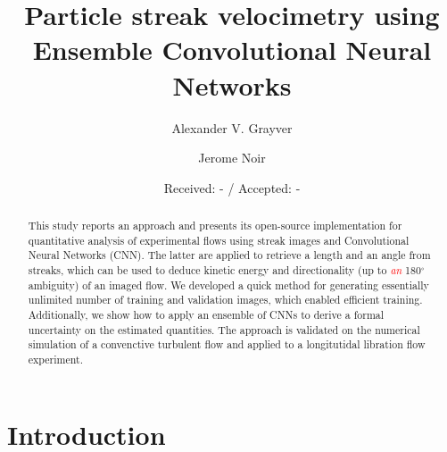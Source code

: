 \documentclass{svjour3}                     %
\newcommand{\new}[1]{\textit{\textcolor{red}{#1}}}
\begin{document}
\title{Particle streak velocimetry using Ensemble Convolutional Neural Networks}

\author{Alexander V. Grayver         \and
        Jerome Noir
}


\date{Received: - / Accepted: -}


\maketitle

\begin{abstract}
This study reports an approach and presents its open-source implementation for quantitative analysis of experimental flows using streak images and Convolutional Neural Networks (CNN). The latter are applied to retrieve a length and an angle from streaks, which can be used to deduce kinetic energy and directionality (up to \new{an} 180$^{\circ}$ ambiguity) of an imaged flow. We developed a quick method for generating essentially unlimited number of training and validation images, which enabled efficient training. Additionally, we show how to apply an ensemble of CNNs to derive a formal uncertainty on the estimated quantities. The approach is validated on the numerical simulation of a convenctive turbulent flow and applied to a longitutidal libration flow experiment.
\end{abstract}

\section{Introduction}
\label{sec:intro}
\end{document}
